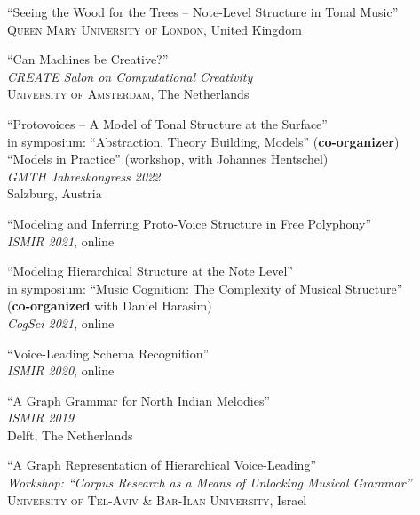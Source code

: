 \documentclass[10pt]{scrartcl}
\newcommand{\margintext}[1]{\marginpar{\raggedleft\small#1}}
\newcommand{\entry}[1]{\vphantom{x}\margintext{#1}}
\begin{document}
\invited \enquote{Seeing the Wood for the Trees -- Note-Level Structure in Tonal Music}
\\
\textsc{Queen Mary University of London}, United Kingdom

\entry{2022}%
\invited \enquote{Can Machines be Creative?}
\\
\textit{CREATE Salon on Computational Creativity}\\
\textsc{University of Amsterdam}, The Netherlands

\contrib \enquote{Protovoices -- A Model of Tonal Structure at the Surface}
\\
in symposium: \enquote{Abstraction, Theory Building, Models} (\textbf{co-organizer})\\
\contrib \enquote{Models in Practice} (workshop, with Johannes Hentschel)\\
\textit{GMTH Jahreskongress 2022}\\
Salzburg, Austria

\entry{2021}%
\contrib \poster \enquote{Modeling and Inferring Proto-Voice Structure in Free Polyphony}
\\
\textit{ISMIR 2021}, online

\contrib \enquote{Modeling Hierarchical Structure at the Note Level}
\\
in symposium: \enquote{Music Cognition: The Complexity of Musical Structure}\\
(\textbf{co-organized} with Daniel Harasim)\\
\textit{CogSci 2021}, online

\entry{2020}%
\contrib \poster \enquote{Voice-Leading Schema Recognition}
\\
\textit{ISMIR 2020}, online

\entry{2019}%
\contrib \poster \enquote{A Graph Grammar for North Indian Melodies}
\\
\textit{ISMIR 2019}\\
Delft, The Netherlands

\invited \enquote{A Graph Representation of Hierarchical Voice-Leading}
\\
\textit{Workshop: \enquote{Corpus Research as a Means of Unlocking Musical Grammar}}\\
\textsc{University of Tel-Aviv \& Bar-Ilan University}, Israel
\end{document}

